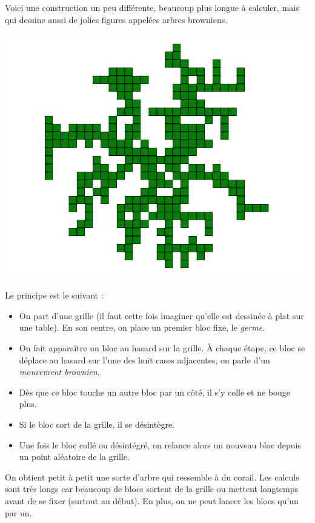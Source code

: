 \documentclass[11pt,class=report,crop=false]{standalone}
\begin{document}
\begin{cours}

Voici une construction un peu différente, beaucoup plus longue à calculer, mais qui dessine aussi de jolies figures appelées \og{}arbres browniens\fg{}.

\begin{center}
\includegraphics[scale=\myscale,scale=0.28]{ecran-alea-arbre1}
\end{center}


Le principe est le suivant :
\begin{itemize}
  \item On part d'une grille (il faut cette fois imaginer qu'elle est dessinée à plat sur une table). En son centre, on place un premier bloc fixe, le \emph{germe}.
  
  \item On fait apparaître un bloc au hasard sur la grille. À chaque étape, ce bloc se déplace au hasard sur l'une des huit cases adjacentes, on parle d'un \emph{mouvement brownien}. 

  \item Dès que ce bloc touche un autre bloc par un côté, il s'y colle et ne bouge plus.

  \item Si le bloc sort de la grille, il se désintègre.
  
  \item Une fois le bloc collé ou désintégré, on relance alors un nouveau bloc depuis un point aléatoire de la grille.
\end{itemize}



On obtient petit à petit une sorte d'arbre qui ressemble à du corail. Les calculs sont très longs car beaucoup de blocs sortent de la grille ou mettent longtemps avant de se fixer (surtout au début). En plus, on ne peut lancer les blocs qu'un par un.

\end{cours}
\end{document}
